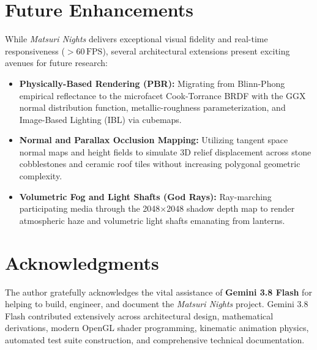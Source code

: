\section{Future Enhancements}
While \textit{Matsuri Nights} delivers exceptional visual fidelity and real-time responsiveness ($>60\,\text{FPS}$), several architectural extensions present exciting avenues for future research:
\begin{itemize}
    \item \textbf{Physically-Based Rendering (PBR):} Migrating from Blinn-Phong empirical reflectance to the microfacet Cook-Torrance BRDF with the GGX normal distribution function, metallic-roughness parameterization, and Image-Based Lighting (IBL) via cubemaps.
    \item \textbf{Normal and Parallax Occlusion Mapping:} Utilizing tangent space normal maps and height fields to simulate 3D relief displacement across stone cobblestones and ceramic roof tiles without increasing polygonal geometric complexity.
    \item \textbf{Volumetric Fog and Light Shafts (God Rays):} Ray-marching participating media through the 2048$\times$2048 shadow depth map to render atmospheric haze and volumetric light shafts emanating from lanterns.
\end{itemize}

\section*{Acknowledgments}
The author gratefully acknowledges the vital assistance of \textbf{Gemini 3.8 Flash} for helping to build, engineer, and document the \textit{Matsuri Nights} project. Gemini 3.8 Flash contributed extensively across architectural design, mathematical derivations, modern OpenGL shader programming, kinematic animation physics, automated test suite construction, and comprehensive technical documentation.

